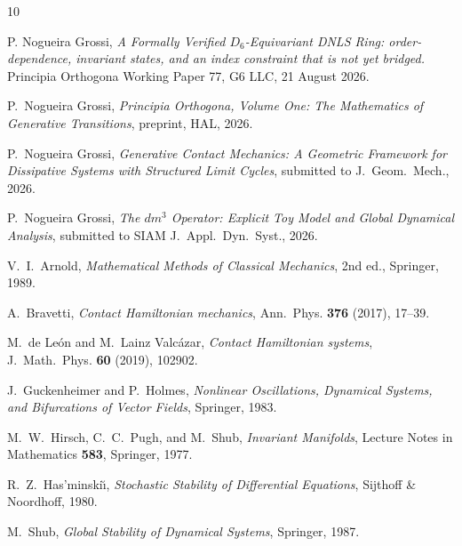 \documentclass[11pt]{article}
\theoremstyle{boxed}
\begin{document}
\begin{thebibliography}{10}

P. Nogueira Grossi, \emph{A Formally Verified $D_6$-Equivariant DNLS Ring:
order-dependence, invariant states, and an index constraint that is not yet bridged.}
Principia Orthogona Working Paper 77, G6 LLC, 21 August 2026.

P.~Nogueira Grossi, \emph{Principia Orthogona, Volume One: The Mathematics of
Generative Transitions}, preprint, HAL, 2026.

P.~Nogueira Grossi, \emph{Generative Contact Mechanics: A Geometric Framework for
Dissipative Systems with Structured Limit Cycles}, submitted to J.~Geom.~Mech., 2026.

P.~Nogueira Grossi, \emph{The $dm^3$ Operator: Explicit Toy Model and Global
Dynamical Analysis}, submitted to SIAM J.~Appl.~Dyn.~Syst., 2026.

V.~I.~Arnold, \emph{Mathematical Methods of Classical Mechanics}, 2nd ed.,
Springer, 1989.

A.~Bravetti, \emph{Contact Hamiltonian mechanics}, Ann.~Phys. \textbf{376} (2017),
17--39.

M.~de Le\'on and M.~Lainz Valc\'azar, \emph{Contact Hamiltonian systems},
J.~Math.~Phys. \textbf{60} (2019), 102902.

J.~Guckenheimer and P.~Holmes, \emph{Nonlinear Oscillations, Dynamical Systems,
and Bifurcations of Vector Fields}, Springer, 1983.

M.~W.~Hirsch, C.~C.~Pugh, and M.~Shub, \emph{Invariant Manifolds},
Lecture Notes in Mathematics \textbf{583}, Springer, 1977.

R.~Z.~Has\textquoteright minski\u{\i}, \emph{Stochastic Stability of Differential
Equations}, Sijthoff \& Noordhoff, 1980.

M.~Shub, \emph{Global Stability of Dynamical Systems}, Springer, 1987.
\end{thebibliography}
\end{document}
